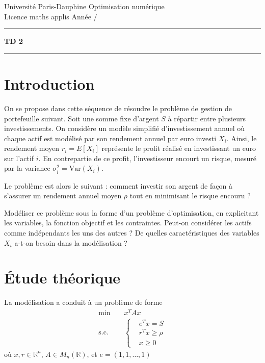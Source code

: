 \documentclass[10pt,a4paper,fleqn]{report}
\makeatletter
\def\cleardoublepage{\clearpage\if@twoside\ifodd\c@page\else\hbox{}\thispagestyle{empty}\newpage\fi\fi}
\newcommand{\R}{\mathbb R}
\makeatother
\begin{document}
\cleardoublepage

\noindent
Universit\'e Paris-Dauphine     \hfill      Optimisation num\'erique\\
Licence maths applis      \hfill      Ann\'ee /

\medskip

\hrule

\medskip



\begin{center}

\textbf{\huge TD 2}

\smallskip

\rule{10cm}{0.4pt}

\end{center}

\section{Introduction}
On se propose dans cette séquence de résoudre le problème de gestion
de portefeuille suivant. Soit une somme fixe d'argent $S$ à répartir
entre plusieurs investissements. On considère un modèle simplifié
d'investissement annuel où chaque actif est modélisé par son rendement
annuel par euro investi $X_{i}$. Ainsi, le rendement moyen $r_{i} =
E[X_{i}]$ représente le profit réalisé en investissant un euro sur
l'actif $i$. En contrepartie de ce profit, l'investisseur encourt un
risque, mesuré par la variance $\sigma_{i}^{2} = \text{Var}(X_{i})$.

Le problème est alors le suivant : comment investir son argent de
façon à s'assurer un rendement annuel moyen $\rho$ tout en minimisant
le risque encouru ?

Modéliser ce problème sous la forme d'un problème d'optimisation, en
explicitant les variables, la fonction objectif et les
contraintes. Peut-on considérer les actifs comme indépendants les uns
des autres ? De quelles caractéristiques des variables $X_{i}$ a-t-on
besoin dans la modélisation ?

\section{Étude théorique}
La modélisation a conduit à un problème de forme
\begin{align*}
  \text{min} \;\;\;\;&x^{T} A x\\
  \text{s.c.}\;\;\;\;&\begin{cases}
    &e^{T} x = S\\
  &r^{T} x \geq \rho\\
  &x \geq 0
  \end{cases}
\end{align*}
où $x, r \in \R^{n}$, $A \in M_{n}(\R)$, et $e = (1,1,\dots,1)$
\end{document}

